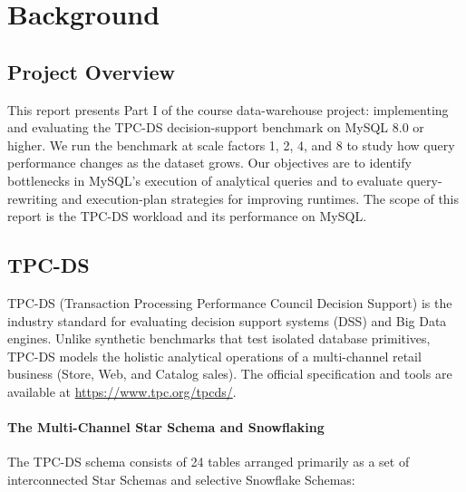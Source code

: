 \documentclass{ULBreport}
\begin{document}
\chapter{Background}

\section{Project Overview}

This report presents Part I of the course data-warehouse project: implementing and evaluating the TPC-DS decision-support benchmark on MySQL 8.0 or higher. We run the benchmark at scale factors 1, 2, 4, and 8 to study how query performance changes as the dataset grows. Our objectives are to identify bottlenecks in MySQL's execution of analytical queries and to evaluate query-rewriting and execution-plan strategies for improving runtimes. The scope of this report is the TPC-DS workload and its performance on MySQL.

\section{TPC-DS}

TPC-DS (Transaction Processing Performance Council Decision Support) is the industry standard for evaluating decision support systems (DSS) and Big Data engines. Unlike synthetic benchmarks that test isolated database primitives, TPC-DS models the holistic analytical operations of a multi-channel retail business (Store, Web, and Catalog sales). The official specification and tools are available at \url{https://www.tpc.org/tpcds/}.

\subsubsection{The Multi-Channel Star Schema and Snowflaking}

The TPC-DS schema consists of 24 tables arranged primarily as a set of interconnected Star Schemas and selective Snowflake Schemas:
\end{document}
